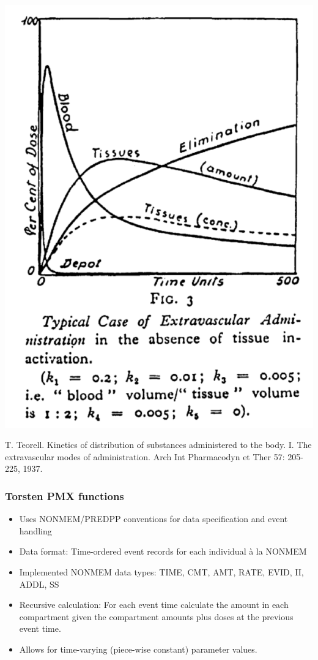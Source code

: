\documentclass{beamer}
\begin{document}
\begin{frame}
\begin{center}
\includegraphics[height=0.5\textheight]{graphics/teorellModel2.pdf}
\end{center}
T. Teorell. Kinetics of distribution of substances
administered to the body. I. The extravascular modes of
administration. Arch Int Pharmacodyn et Ther 57: 205-225, 1937.
  
\end{frame}

\begin{frame}
  \frametitle{Torsten PMX functions}

  \begin{itemize}
  \item Uses NONMEM/PREDPP conventions for data specification and
    event handling
  \item Data format: Time-ordered event records for each individual
    \`a la NONMEM
  \item Implemented NONMEM data types: TIME, CMT, AMT, RATE, EVID, II,
    ADDL, SS
  \item Recursive calculation: For each event time calculate the
    amount in each compartment given the compartment amounts plus
    doses at the previous event time.
  \item Allows for time-varying (piece-wise constant) parameter
    values.
  \end{itemize}
  
\end{frame}
\end{document}
